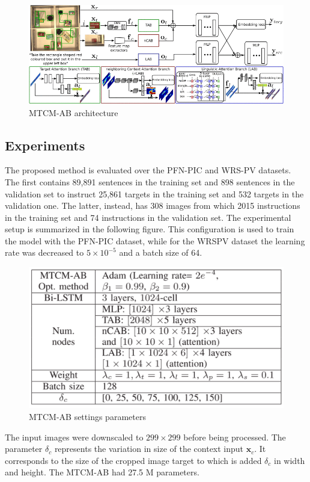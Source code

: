 \begin{figure}[h!]
\centering
\includegraphics[width=0.8\linewidth]{images/MTMC-AB.png}
\caption{MTCM-AB architecture}
\end{figure}

\subsection{Experiments}\label{header-n318}

The proposed method is evaluated over the PFN-PIC and WRS-PV datasets.
The first contains 89,891 sentences in the training set and 898
sentences in the validation set to instruct 25,861 targets in the
training set and 532 targets in the validation one. The latter, instead,
has 308 images from which 2015 instructions in the training set and 74
instructions in the validation set. The experimental setup is summarized
in the following figure. This configuration is used to train the model
with the PFN-PIC dataset, while for the WRSPV dataset the learning rate
was decreased to $5 \times 10^{-5}$ and a batch size of 64.

\begin{figure}[h!]
\centering
\includegraphics[width=0.85\linewidth]{images/MTCMsettings.png}
\caption{MTCM-AB settings parameters}
\end{figure}

The input images were downscaled to $299 \times 299$ before being processed.
The parameter $\delta_c$ represents the variation in size of the
context input ${\mathbf x}_c$. It corresponds to the size of the cropped
image target to which is added $\delta_c$ in width and height. The
MTCM-AB had 27.5 M parameters.

